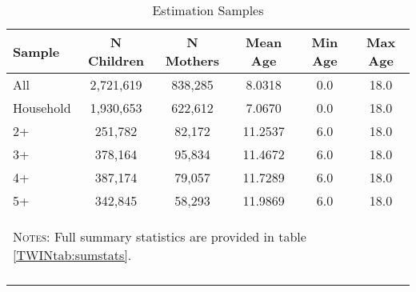 \begin{table}[!htbp] \centering 
\caption{Estimation Samples} 
 \label{TWINtab:Samples} 
\begin{tabular}{lccccc} \toprule \toprule 
Sample&N Children&N Mothers&Mean Age&Min Age&Max Age
\\\midrule
All&2,721,619&838,285& 8.0318&    0.0&   18.0
\\
Household&1,930,653&622,612& 7.0670&    0.0&   18.0
\\
2+&251,782&82,172&11.2537&    6.0&   18.0
\\
3+&378,164&95,834&11.4672&    6.0&   18.0
\\
4+&387,174&79,057&11.7289&    6.0&   18.0
\\
5+&342,845&58,293&11.9869&    6.0&   18.0
\\

\midrule\multicolumn{6}{p{10.0cm}}{\begin{footnotesize}\textsc{Notes:} Full summary statistics are provided in table \ref{TWINtab:sumstats}.\end{footnotesize}}\\  
\bottomrule \normalsize\end{tabular}\end{table} 
